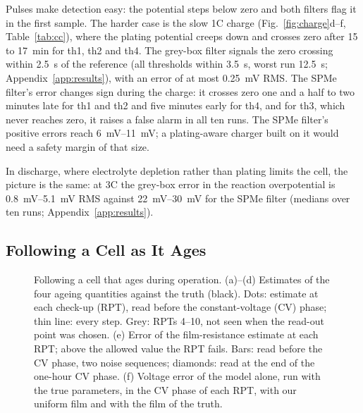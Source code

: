 \documentclass[journal]{IEEEtran}
\begin{document}
Pulses make detection easy: the potential steps below zero and both filters flag it in the first sample. The harder case is the slow 1C charge (Fig.~\ref{fig:charge}d--f, Table~\ref{tab:cc}), where the plating potential creeps down and crosses zero after 15 to \SI{17}{\minute} for th1, th2 and th4. The grey-box filter signals the zero crossing within \SI{2.5}{\second} of the reference (all thresholds within \SI{3.5}{\second}, worst run \SI{12.5}{\second}; Appendix~\ref{app:results}), with an error of at most \SI{0.25}{\milli\volt} RMS. The SPMe filter's error changes sign during the charge: it crosses zero one and a half to two minutes late for th1 and th2 and five minutes early for th4, and for th3, which never reaches zero, it raises a false alarm in all ten runs. The SPMe filter's positive errors reach \SIrange{6}{11}{\milli\volt}; a plating-aware charger built on it would need a safety margin of that size.


In discharge, where electrolyte depletion rather than plating limits the cell, the picture is the same: at 3C the grey-box error in the reaction overpotential is \SIrange{0.8}{5.1}{\milli\volt} RMS against \SIrange{22}{30}{\milli\volt} for the SPMe filter (medians over ten runs; Appendix~\ref{app:results}).

\subsection{Following a Cell as It Ages}\label{sec:tracking}
\begin{figure}[t]
\centering

\caption{Following a cell that ages during operation. (a)--(d) Estimates of the four ageing quantities against the truth (black). Dots: estimate at each check-up (RPT), read before the constant-voltage (CV) phase; thin line: every step. Grey: RPTs 4--10, not seen when the read-out point was chosen. (e) Error of the film-resistance estimate at each RPT; above the allowed value the RPT fails. Bars: read before the CV phase, two noise sequences; diamonds: read at the end of the one-hour CV phase. (f) Voltage error of the model alone, run with the true parameters, in the CV phase of each RPT, with our uniform film and with the film of the truth.}
\label{fig:tracking}
\end{figure}
\end{document}
